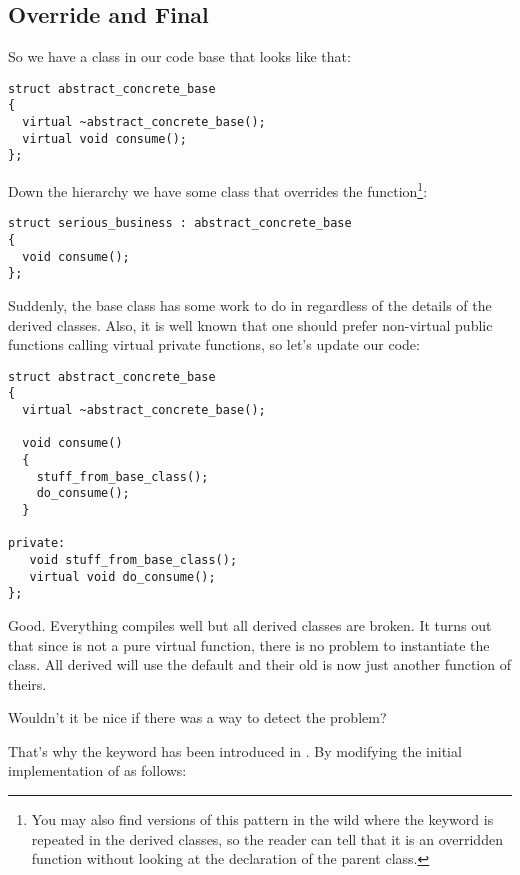\subsection{Override and Final}

So we have a class in our  code base that looks like that:

\begin{lstlisting}
struct abstract_concrete_base
{
  virtual ~abstract_concrete_base();
  virtual void consume();
};
\end{lstlisting}

Down the hierarchy we have some class that overrides the
 function\footnote{You may also find versions of this
  pattern in the wild where the  keyword is repeated in
  the derived classes, so the reader can tell that it is an overridden
  function without looking at the declaration of the parent class.}:

\begin{lstlisting}
struct serious_business : abstract_concrete_base
{
  void consume();
};
\end{lstlisting}

Suddenly, the base class has some work to do in 
regardless of the details of the derived classes. Also, it is well
known that one should prefer non-virtual public functions calling
virtual private functions, so let's update our code:

\begin{lstlisting}
struct abstract_concrete_base
{
  virtual ~abstract_concrete_base();

  void consume()
  {
    stuff_from_base_class();
    do_consume();
  }

private:
   void stuff_from_base_class();
   virtual void do_consume();
};
\end{lstlisting}

Good. Everything compiles well but all derived classes are broken. It
turns out that since  is not a pure virtual
function, there is no problem to instantiate the class. All derived
will use the default  and their old
 is now just another function of theirs.

Wouldn't it be nice if there was a way to detect the problem?

\medskip

That's why the  keyword has been introduced in
. By modifying the initial implementation of
 as follows:

